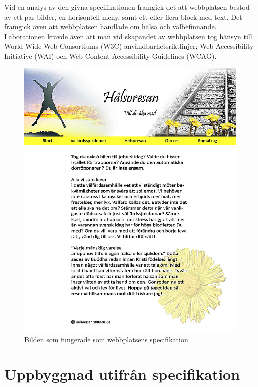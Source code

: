 \documentclass[a4paper,10pt]{article}
\begin{document}
Vid en analys av den givna specifikationen framgick det att webbplatsen bestod av ett par bilder, en horisontell meny, samt ett eller flera block med text. Det framgick även att webbplatsen handlade om hälsa och välbefinnande. Laborationen krävde även att man vid skapandet av webbplatsen tog hänsyn till World Wide Web Consortiums (W3C) användbarhetsriktlinjer; Web Accessibility Initiative (WAI) och Web Content Accessibility Guidelines (WCAG).

\begin{figure}[h]
 \begin{center}
  \includegraphics{specification.eps}
 \end{center}
 \caption{Bilden som fungerade som webbplatsens specifikation}
 \label{specifikation}
\end{figure}

\section{Uppbyggnad utifrån specifikation}
\end{document}
